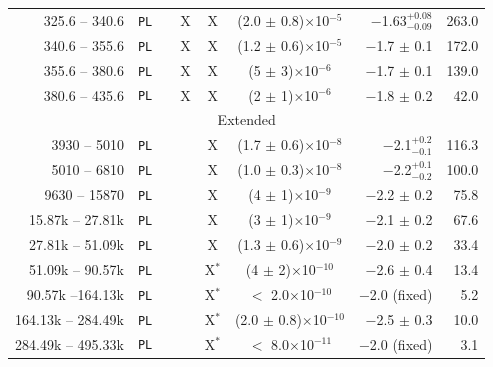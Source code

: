 \documentclass[preprint]{aastex631}
\begin{document}
\begin{table}[ht]
\begin{small}
\begin{tabular}{r | c | c @{\hspace{-3pt}} c @{\hspace{-3pt}} c | c | r | r}
  325.6 -- 340.6  &         \texttt{PL} &  & X& X&        (2.0 $\pm$ 0.8)$\times$10$^{-5}$ &                  $-$1.63$^{+0.08}_{-0.09}$ & 263.0 \\
  340.6 -- 355.6  &         \texttt{PL} &  & X& X&        (1.2 $\pm$ 0.6)$\times$10$^{-5}$ &                           $-$1.7 $\pm$ 0.1 & 172.0 \\
  355.6 -- 380.6  &         \texttt{PL} &  & X& X&            (5 $\pm$ 3)$\times$10$^{-6}$ &                           $-$1.7 $\pm$ 0.1 & 139.0 \\
  380.6 -- 435.6  &         \texttt{PL} &  & X& X&            (2 $\pm$ 1)$\times$10$^{-6}$ &                           $-$1.8 $\pm$ 0.2 & 42.0 \\

\hline
  \multicolumn{8}{c}{Extended}\\
\hline
 3930 -- 5010  &         \texttt{PL} &  &  & X&        (1.7 $\pm$ 0.6)$\times$10$^{-8}$ &                     $-$2.1$^{+0.2}_{-0.1}$ & 116.3 \\
 5010 -- 6810  &         \texttt{PL} &  &  & X&        (1.0 $\pm$ 0.3)$\times$10$^{-8}$ &                     $-$2.2$^{+0.1}_{-0.2}$ & 100.0 \\
 9630 -- 15870  &         \texttt{PL} &  &  & X&            (4 $\pm$ 1)$\times$10$^{-9}$ &                           $-$2.2 $\pm$ 0.2 & 75.8 \\
 15.87k -- 27.81k &         \texttt{PL} &  &  & X&            (3 $\pm$ 1)$\times$10$^{-9}$ &                           $-$2.1 $\pm$ 0.2 & 67.6 \\
 27.81k -- 51.09k &         \texttt{PL} &  &  & X&        (1.3 $\pm$ 0.6)$\times$10$^{-9}$ &                           $-$2.0 $\pm$ 0.2 & 33.4 \\
 51.09k -- 90.57k &         \texttt{PL} &  &  & X$^{*}$&           (4 $\pm$ 2)$\times$10$^{-10}$ &                           $-$2.6 $\pm$ 0.4 & 13.4 \\
 90.57k --164.13k &         \texttt{PL} &  &  & X$^{*}$&                 $<$ 2.0$\times$10$^{-10}$ &                               $-$2.0 (fixed) & 5.2 \\
164.13k -- 284.49k &         \texttt{PL} &  &  & X$^{*}$&       (2.0 $\pm$ 0.8)$\times$10$^{-10}$ &                           $-$2.5 $\pm$ 0.3 & 10.0 \\
284.49k -- 495.33k &         \texttt{PL} &  &  & X$^{*}$&                 $<$ 8.0$\times$10$^{-11}$ &                               $-$2.0 (fixed) & 3.1 \\
    \hline
    \end{tabular}

\end{small}
\end{table}
\end{document}
